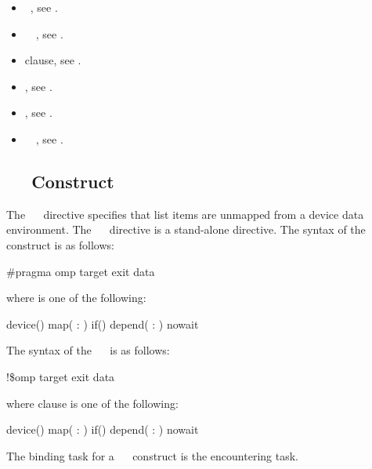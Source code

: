 \crossreferences
\begin{itemize}
\item {}~, see .
\item {}~~, see .
\item {} clause, see .
\item {}, see .
\item {}, see .
\item {}~~, see . 
\end{itemize}

%
%
\subsection{~~ Construct}
\label{subsec:target exit data Construct}
\summary
The ~~ directive specifies that list items are unmapped from a device data environment. The ~~ directive is a stand-alone directive.
\syntax
\ccppspecificstart
The syntax of the ~~ construct is as follows:
\begin{boxedcode}
\#pragma omp target exit data 
\end{boxedcode}
where  is one of the following:
\begin{indentedcodelist}
device()
map(\plc{[ [map-type-modifier[,]] map-type} : \plc{] list})
if()
depend( : )
nowait
\end{indentedcodelist}
\ccppspecificend
\fortranspecificstart
The syntax of the ~~ is as follows:
\begin{boxedcode}
!\$omp target exit data 
\end{boxedcode}
where clause is one of the following:
\begin{indentedcodelist}
device()
map(\plc{[ [map-type-modifier[,]] map-type} : \plc{] list})
if()
depend( : )
nowait
\end{indentedcodelist}
\fortranspecificend
\binding
The binding task for a ~~ construct is the encountering task. 

